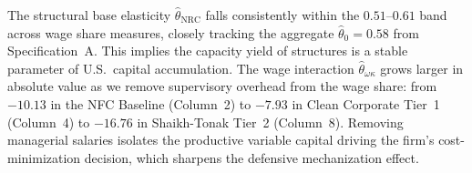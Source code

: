 The structural base elasticity $\hat{\theta}_{\text{NRC}}$ falls consistently within the $0.51$--$0.61$ band across wage share measures, closely tracking the aggregate $\hat{\theta}_0 = 0.58$ from Specification~A. This implies the capacity yield of structures is a stable parameter of U.S.\ capital accumulation. The wage interaction $\hat{\theta}_{\omega\kappa}$ grows larger in absolute value as we remove supervisory overhead from the wage share: from $-10.13$ in the NFC Baseline (Column~2) to $-7.93$ in Clean Corporate Tier~1 (Column~4) to $-16.76$ in Shaikh-Tonak Tier~2 (Column~8). Removing managerial salaries isolates the productive variable capital driving the firm's cost-minimization decision, which sharpens the defensive mechanization effect.




